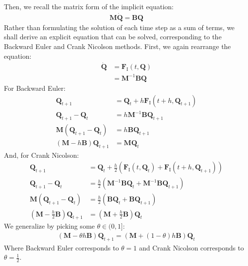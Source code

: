 \documentclass{article}
\newcommand{\bvec}[1]{\boldsymbol{#1}}
\newcommand{\bmat}[1]{\boldsymbol{#1}}
\begin{document}
Then, we recall the matrix form of the implicit equation:
\begin{align*}
    \bmat{M} \dot{\bvec{Q}} = \bmat{B} \bvec{Q}
\end{align*}
Rather than formulating the solution of each time step as a sum of terms,
we shall derive an explicit equation that can be solved,
corresponding to the Backward Euler and Crank Nicolson methods.
First, we again rearrange the equation:
\begin{align*}
    \dot{\bvec{Q}}
        & = \bvec{F}_\text{I}(t, \bvec{Q}) \\
        & = \bmat{M}^{-1} \bmat{B} \bvec{Q}
\end{align*}
\noindent For Backward Euler:
\begin{align*}
    \bvec{Q}_{t + 1} & = \bvec{Q}_t + h \bvec{F}_\text{I}(t + h, \bvec{Q}_{t + 1}) \\
    \bvec{Q}_{t + 1} - \bvec{Q}_t & = h \bmat{M}^{-1} \bmat{B} \bvec{Q}_{t + 1} \\
    \bmat{M} (\bvec{Q}_{t + 1} - \bvec{Q}_t) & = h \bmat{B} \bvec{Q}_{t + 1} \\
    (\bmat{M} - h \bmat{B}) \bvec{Q}_{t + 1} & = \bmat{M} \bvec{Q}_t
\end{align*}
\noindent And, for Crank Nicolson:
\begin{align*}
    \bvec{Q}_{t + 1} & = \bvec{Q}_t + \frac{h}{2}
        (\bvec{F}_\text{I}(t, \bvec{Q}_t) + \bvec{F}_\text{I}(t + h, \bvec{Q}_{t + 1})) \\
    \bvec{Q}_{t + 1} - \bvec{Q}_t & = \frac{h}{2}
        (\bmat{M}^{-1} \bmat{B} \bvec{Q}_t + \bmat{M}^{-1} \bmat{B} \bvec{Q}_{t + 1}) \\
    \bmat{M} (\bvec{Q}_{t + 1} - \bvec{Q}_t) & = \frac{h}{2}
        (\bmat{B} \bvec{Q}_t + \bmat{B} \bvec{Q}_{t + 1}) \\
    (\bmat{M} - \frac{h}{2} \bmat{B}) \bvec{Q}_{t + 1} & = (\bmat{M} + \frac{h}{2} \bmat{B}) \bvec{Q}_t
\end{align*}
\noindent We generalize by picking some $\theta \in (0, 1]$:
\begin{align*}
    (\bmat{M} - \theta h \bmat{B}) \bvec{Q}_{t + 1} = (\bmat{M} + (1 - \theta) h \bmat{B}) \bvec{Q}_t
\end{align*}
\noindent Where Backward Euler corresponds to $\theta = 1$
and Crank Nicolson corresponds to $\theta = \frac{1}{2}$.
\end{document}
